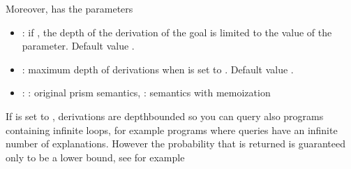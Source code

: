 \documentclass[letterpaper,10pt,english]{sphinxmanual}
\begin{document}
\sphinxAtStartPar
Moreover,  has the parameters
\begin{itemize}
\item {} 
\sphinxAtStartPar
{}: if , the depth of the derivation of the goal is limited to the value of the  parameter. Default value .

\item {} 
\sphinxAtStartPar
{}: maximum depth of derivations when  is set to . Default value .

\item {} 
\sphinxAtStartPar
{}: : original prism semantics, : semantics with memoization

\end{itemize}

\sphinxAtStartPar
If  is set to , derivations are depth\sphinxhyphen{}bounded so you can query also programs containing infinite loops, for example programs where queries have an infinite number of explanations.
However the probability that is returned is guaranteed only to be a lower bound, see for example 
\end{document}
